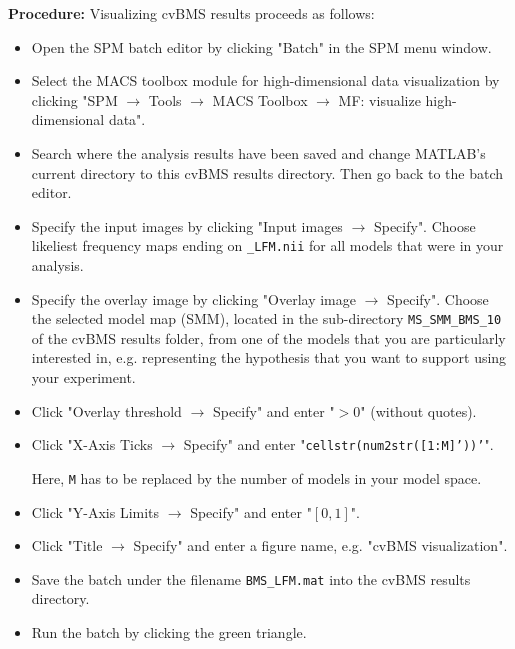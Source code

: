 \documentclass[a4paper,12pt]{article}
\newcommand{\ra}{$\rightarrow$ }
\begin{document}
\textbf{Procedure:} Visualizing cvBMS results proceeds as follows:
\begin{itemize}
	
\item
Open the SPM batch editor by clicking "Batch" in the SPM menu window.

\item
Select the MACS toolbox module for high-dimensional data visualization by clicking "SPM \ra Tools \ra MACS Toolbox \ra MF: visualize high-dimensional data".

\item
Search where the analysis results have been saved and change MATLAB's current directory to this cvBMS results directory. Then go back to the batch editor.

\item
Specify the input images by clicking "Input images \ra Specify". Choose likeliest frequency maps ending on \texttt{\_LFM.nii} for all models that were in your analysis.

\item
Specify the overlay image by clicking "Overlay image \ra Specify". Choose the selected model map (SMM), located in the sub-directory \texttt{MS\_SMM\_BMS\_10} of the cvBMS results folder, from one of the models that you are particularly interested in, e.g. representing the hypothesis that you want to support using your experiment.

\item
Click "Overlay threshold \ra Specify" and enter "$>\!0$" (without quotes).

\item
Click "X-Axis Ticks \ra Specify" and enter "\texttt{cellstr(num2str([1:M]'))'}".

Here, \texttt{M} has to be replaced by the number of models in your model space.

\item
Click "Y-Axis Limits \ra Specify" and enter "$[0, 1]$".

\item
Click "Title \ra Specify" and enter a figure name, e.g. "cvBMS visualization".

\item
Save the batch under the filename \texttt{BMS\_LFM.mat} into the cvBMS results directory.

\item
Run the batch by clicking the green triangle.
	
\end{itemize}
\end{document}

